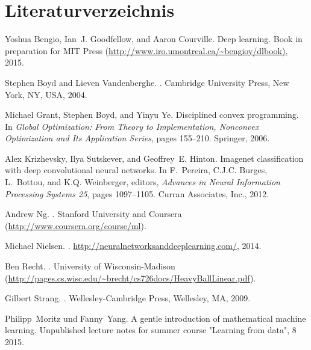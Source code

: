 \section*{Literaturverzeichnis}

\begin{thebibliography}{99}

Yoshua Bengio, Ian~J. Goodfellow, and Aaron Courville.
\newblock Deep learning.
\newblock Book in preparation for MIT Press
  (\url{http://www.iro.umontreal.ca/~bengioy/dlbook)}, 2015.

Stephen Boyd and Lieven Vandenberghe.
.
\newblock Cambridge University Press, New York, NY, USA, 2004.

Michael Grant, Stephen Boyd, and Yinyu Ye.
\newblock Disciplined convex programming.
\newblock In {\em Global Optimization: From Theory to Implementation, Nonconvex
  Optimization and Its Application Series}, pages 155--210. Springer, 2006.

Alex Krizhevsky, Ilya Sutskever, and Geoffrey~E. Hinton.
\newblock Imagenet classification with deep convolutional neural networks.
\newblock In F.~Pereira, C.J.C. Burges, L.~Bottou, and K.Q. Weinberger,
  editors, {\em Advances in Neural Information Processing Systems 25}, pages
  1097--1105. Curran Associates, Inc., 2012.

Andrew Ng.
.
\newblock Stanford University and Coursera
  (\url{http://www.coursera.org/course/ml}).

Michael Nielsen.
.
\newblock \url{http://neuralnetworksanddeeplearning.com/}, 2014.

Ben Recht.
.
\newblock University of Wisconsin-Madison
  (\url{http://pages.cs.wisc.edu/~brecht/cs726docs/HeavyBallLinear.pdf}).

Gilbert Strang.
.
\newblock Wellesley-Cambridge Press, Wellesley, MA, 2009.

Philipp~Moritz und Fanny~Yang.
\newblock A gentle introduction of mathematical machine learning.
\newblock Unpublished lecture notes for summer course "Learning from data", 8
  2015.

\end{thebibliography}


%
